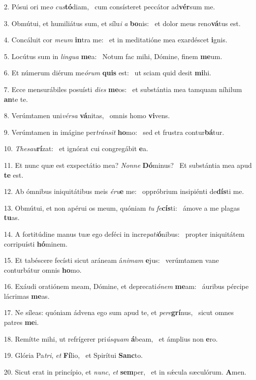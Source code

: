 2. Pósui ori me\textit{o} \textit{cus}\textbf{tó}diam, \ast\  cum consísteret peccátor ad\textbf{vér}sum me.\

3. Obmútui, et humiliátus sum, et sílu\textit{i} \textit{a} \textbf{bo}nis: \ast\  et dolor meus reno\textbf{vá}tus est.\

4. Concáluit cor \textit{me}\textit{um} \textbf{in}tra me: \ast\  et in meditatióne mea exardéscet \textbf{i}gnis.\

5. Locútus sum in \textit{lin}\textit{gua} \textbf{me}a: \ast\  Notum fac mihi, Dómine, finem \textbf{me}um.\

6. Et númerum diérum me\textit{ó}\textit{rum} \textbf{quis} est: \ast\  ut sciam quid desit \textbf{mi}hi.\

7. Ecce mensurábiles posuísti \textit{di}\textit{es} \textbf{me}os: \ast\  et substántia mea tamquam níhilum \textbf{an}te te.\

8. Verúmtamen uni\textit{vér}\textit{sa} \textbf{vá}nitas, \ast\  omnis homo \textbf{vi}vens.\

9. Verúmtamen in imágine per\textit{tráns}\textit{it} \textbf{ho}mo: \ast\  sed et frustra contur\textbf{bá}tur.\

10. \textit{The}\textit{sau}\textbf{rí}zat: \ast\  et ignórat cui congregábit \textbf{e}a.\

11. Et nunc quæ est exspectátio mea? \textit{Non}\textit{ne} \textbf{Dó}minus? \ast\  Et substántia mea apud \textbf{te} est.\

12. Ab ómnibus iniquitátibus meis \textit{é}\textit{ru}\textbf{e} me: \ast\  oppróbrium insipiénti de\textbf{dís}ti me.\

13. Obmútui, et non apérui os meum, quóniam \textit{tu} \textit{fe}\textbf{cís}ti: \ast\  ámove a me plagas \textbf{tu}as.\

14. A fortitúdine manus tuæ ego deféci in incre\textit{pa}\textit{ti}\textbf{ó}nibus: \ast\  propter iniquitátem corripuísti \textbf{hó}minem.\

15. Et tabéscere fecísti sicut aráneam á\textit{ni}\textit{mam} \textbf{e}jus: \ast\  verúmtamen vane conturbátur omnis \textbf{ho}mo.\

16. Exáudi oratiónem meam, Dómine, et deprecati\textit{ó}\textit{nem} \textbf{me}am: \ast\  áuribus pércipe lácrimas \textbf{me}as.\

17. Ne síleas: quóniam ádvena ego sum apud te, et \textit{per}\textit{e}\textbf{grí}nus, \ast\  sicut omnes patres \textbf{me}i.\

18. Remítte mihi, ut refrígerer pri\textit{ús}\textit{quam} \textbf{á}beam, \ast\  et ámplius non \textbf{e}ro.\

19. Glória Pa\textit{tri}, \textit{et} \textbf{Fí}lio, \ast\  et Spirítui \textbf{Sanc}to.\

20. Sicut erat in princípio, et \textit{nunc}, \textit{et} \textbf{sem}per, \ast\  et in sǽcula sæculórum. \textbf{A}men.\

